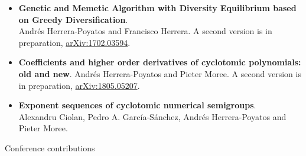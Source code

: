 \documentclass[10pt,a4paper,sans]{moderncv} %
\begin{document}
	\begin{itemize}
		\item \textbf{Genetic and Memetic Algorithm with Diversity Equilibrium based on Greedy Diversification}. \\ Andr\'es Herrera-Poyatos and Francisco Herrera.
          	A second version is in preparation, \textcolor{colorl}{\href{https://arxiv.org/abs/1702.03594}{arXiv:1702.03594}}.
		\item \textbf{Coefficients and higher order derivatives of cyclotomic polynomials: old and new}. Andr\'es Herrera-Poyatos and Pieter Moree. %
		A second version is in preparation, \textcolor{colorl}{\href{https://arxiv.org/abs/1805.05207}{arXiv:1805.05207}}.
		\item \textbf{Exponent sequences of cyclotomic numerical semigroups}.\\ Alexandru Ciolan, Pedro A. Garc\'ia-S\'anchez, Andr\'es Herrera-Poyatos and Pieter Moree. %
		\end{itemize}

{\large \textcolor{color1}{Conference contributions}}
\end{document}
